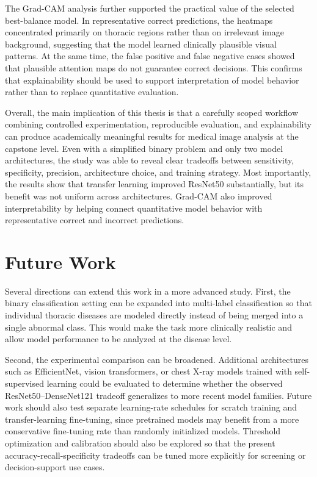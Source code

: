 The Grad-CAM analysis further supported the practical value of the selected best-balance model. In representative correct predictions, the heatmaps concentrated primarily on thoracic regions rather than on irrelevant image background, suggesting that the model learned clinically plausible visual patterns. At the same time, the false positive and false negative cases showed that plausible attention maps do not guarantee correct decisions. This confirms that explainability should be used to support interpretation of model behavior rather than to replace quantitative evaluation.

Overall, the main implication of this thesis is that a carefully scoped workflow combining controlled experimentation, reproducible evaluation, and explainability can produce academically meaningful results for medical image analysis at the capstone level. Even with a simplified binary problem and only two model architectures, the study was able to reveal clear tradeoffs between sensitivity, specificity, precision, architecture choice, and training strategy. Most importantly, the results show that transfer learning improved ResNet50 substantially, but its benefit was not uniform across architectures. Grad-CAM also improved interpretability by helping connect quantitative model behavior with representative correct and incorrect predictions.

\section{Future Work}
Several directions can extend this work in a more advanced study. First, the binary classification setting can be expanded into multi-label classification so that individual thoracic diseases are modeled directly instead of being merged into a single abnormal class. This would make the task more clinically realistic and allow model performance to be analyzed at the disease level.

Second, the experimental comparison can be broadened. Additional architectures such as EfficientNet, vision transformers, or chest X-ray models trained with self-supervised learning could be evaluated to determine whether the observed ResNet50--DenseNet121 tradeoff generalizes to more recent model families. Future work should also test separate learning-rate schedules for scratch training and transfer-learning fine-tuning, since pretrained models may benefit from a more conservative fine-tuning rate than randomly initialized models. Threshold optimization and calibration should also be explored so that the present accuracy-recall-specificity tradeoffs can be tuned more explicitly for screening or decision-support use cases.

